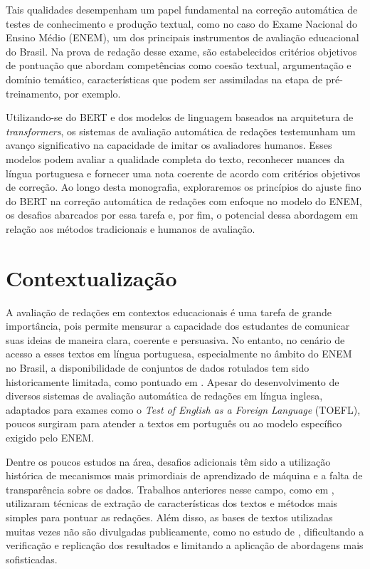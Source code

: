Tais qualidades desempenham um papel fundamental na correção automática de testes de conhecimento e produção textual, como no caso do Exame Nacional do Ensino Médio (ENEM), um dos principais instrumentos de avaliação educacional do Brasil. Na prova de redação desse exame, são estabelecidos critérios objetivos de pontuação que abordam competências como coesão textual, argumentação e domínio temático, características que podem ser assimiladas na etapa de pré-treinamento, por exemplo.

Utilizando-se do BERT e dos modelos de linguagem baseados na arquitetura de \textit{transformers}, os sistemas de avaliação automática de redações testemunham um avanço significativo na capacidade de imitar os avaliadores humanos. Esses modelos podem avaliar a qualidade completa do texto, reconhecer nuances da língua portuguesa e fornecer uma nota coerente de acordo com critérios objetivos de correção. Ao longo desta monografia, exploraremos os princípios do ajuste fino do BERT na correção automática de redações com enfoque no modelo do ENEM, os desafios abarcados por essa tarefa e, por fim, o potencial dessa abordagem em relação aos métodos tradicionais e humanos de avaliação.

\section{Contextualização}

A avaliação de redações em contextos educacionais é uma tarefa de grande importância, pois permite mensurar a capacidade dos estudantes de comunicar suas ideias de maneira clara, coerente e persuasiva. No entanto, no cenário de acesso a esses textos em língua portuguesa, especialmente no âmbito do ENEM no Brasil, a disponibilidade de conjuntos de dados rotulados tem sido historicamente limitada, como pontuado em \cite{marinho-et-al-21}. Apesar do desenvolvimento de diversos sistemas de avaliação automática de redações em língua inglesa, adaptados para exames como o \textit{Test of English as a Foreign Language} (TOEFL), poucos surgiram para atender a textos em português ou ao modelo específico exigido pelo ENEM.

Dentre os poucos estudos na área, desafios adicionais têm sido a utilização histórica de mecanismos mais primordiais de aprendizado de máquina e a falta de transparência sobre os dados. Trabalhos anteriores nesse campo, como em \cite{amorim-et-al-2017}, utilizaram técnicas de extração de características dos textos e métodos mais simples para pontuar as redações. Além disso, as bases de textos utilizadas muitas vezes não são divulgadas publicamente, como no estudo de \cite{fonseca-et-al-2018}, dificultando a verificação e replicação dos resultados e limitando a aplicação de abordagens mais sofisticadas.

